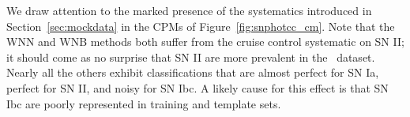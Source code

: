 We draw attention to the marked presence of the systematics introduced in Section~\ref{sec:mockdata} in the CPMs of Figure~\ref{fig:snphotcc_cm}.
Note that the WNN and WNB methods both suffer from the cruise control systematic on SN II; it should come as no surprise that SN II are more prevalent in the \snphotcc\ dataset.
Nearly all the others exhibit classifications that are almost perfect for SN Ia, perfect for SN II, and noisy for SN Ibc.
A likely cause for this effect is that SN Ibc are poorly represented in training and template sets.
%

